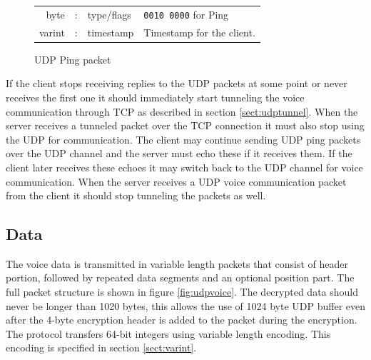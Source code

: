 \documentclass[11pt]{article} %
\begin{document}
\begin{figure}[H]\begin{center}\begin{tabular}{|rcl|p{}}

\cline{1-3}
byte &:& type/flags & \texttt{0010 0000} for Ping \\
\cline{1-3}
varint &:& timestamp & Timestamp for the client. \\
\cline{1-3}

\end{tabular}
\caption{UDP Ping packet}\label{fig:udpping}
\end{center}\end{figure}

If the client stops receiving replies to the UDP packets at some point or never receives the first one it should immediately start tunneling the voice communication through TCP as described in section \ref{sect:udptunnel}. When the server receives a tunneled packet over the TCP connection it must also stop using the UDP for communication. The client may continue sending UDP ping packets over the UDP channel and the server must echo these if it receives them. If the client later receives these echoes it may switch back to the UDP channel for voice communication. When the server receives a UDP voice communication packet from the client it should stop tunneling the packets as well.

\subsection{Data}

The voice data is transmitted in variable length packets that consist of header portion, followed by repeated data segments and an optional position part. The full packet structure is shown in figure \ref{fig:udpvoice}. The decrypted data should never be longer than 1020 bytes, this allows the use of 1024 byte UDP buffer even after the 4-byte encryption header is added to the packet during the encryption. The protocol transfers 64-bit integers using variable length encoding. This encoding is specified in section \ref{sect:varint}.
\end{document}
